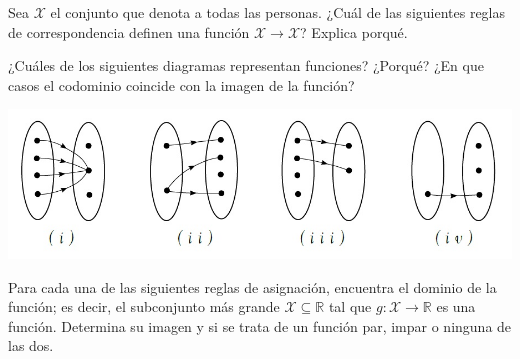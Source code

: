 \documentclass[10pt]{exam}
\begin{document}
\begin{questions}
    \question Sea $\mathcal{X}$ el conjunto que denota a todas las personas. ¿Cuál de las siguientes reglas de correspondencia definen una función $\mathcal{X}\rightarrow\mathcal{X}$? Explica porqué.
    

    \question ¿Cuáles de los siguientes diagramas representan funciones? ¿Porqué? ¿En que casos el codominio coincide con la imagen de la función? \vskip20pt
    
    \includegraphics[scale=0.9]{Func1.jpg}
    
    \question Para cada una de las siguientes reglas de asignación, encuentra el dominio de la función; es decir, el subconjunto más grande $\mathcal{X}\subseteq\mathbb{R}$ tal que $g:\mathcal{X}\rightarrow\mathbb{R}$ es una función. Determina su imagen y si se trata de un función par, impar o ninguna de las dos. 
\end{questions}
\end{document}
